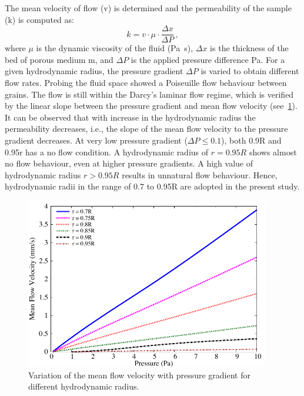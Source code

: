 The mean velocity of flow (v) 
is determined and the permeability of the sample (k) is computed as:
%
\begin{equation}
k=v\cdot\mu\cdot\frac{\Delta x}{\Delta P} \,,
\end{equation}
%
where $\mu$ is the dynamic viscosity of the fluid (\si{\Pa\s}), $\Delta x$ is 
the thickness of the bed of porous medium \si{\m}, and $\Delta P$ is the 
applied pressure difference \si{\Pa}. For a given hydrodynamic radius, the 
pressure gradient $\Delta P$ is varied to obtain different flow rates. Probing 
the fluid space showed a Poiseuille flow behaviour between grains. The flow is 
still within the Darcy's laminar flow regime, which is verified by the linear 
slope between the pressure gradient and mean flow velocity 
(see~\cref{fig:permeability}). It can be observed that with increase in the 
hydrodynamic radius the permeability decreases, i.e., the slope of the mean 
flow velocity 
to the pressure gradient decreases. At very low pressure gradient ($\Delta P 
\le 0.1$), both 0.9R and 0.95r has a no flow condition. A hydrodynamic radius 
of $r = 0.95R$ shows almost no flow behaviour, even at higher pressure 
gradients. A high value of hydrodynamic radius $r > 0.95R$ 
results in unnatural flow behaviour. Hence, hydrodynamic radii in the range of 
0.7 to 0.95R are adopted in the present study.

\begin{figure}[htpb]
\centering
\includegraphics[width=0.95\textwidth]{Permeability}
\caption{Variation of the mean flow velocity with pressure gradient for 
different hydrodynamic radius.}
\label{fig:permeability}
\end{figure}


